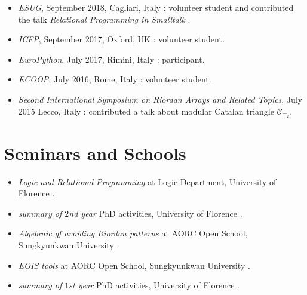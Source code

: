 \documentclass[a4paper]{tufte-handout}
\begin{document}
    \begin{itemize}
        \item \emph{ESUG}, September 2018, Cagliari, Italy : volunteer student and
        contributed the talk \textit{Relational Programming in Smalltalk} .
        \item \emph{ICFP}, September 2017, Oxford, UK : volunteer student.
        \item \emph{EuroPython}, July 2017, Rimini, Italy : participant.
        \item \emph{ECOOP}, July 2016, Rome, Italy : volunteer student.
        \item \emph{Second International Symposium on Riordan Arrays and Related Topics}, 
            July 2015 Lecco, Italy : contributed a talk about modular Catalan triangle $\mathcal{C}_{\equiv_{2}}$.
    \end{itemize}

    \section{Seminars and Schools}

    \begin{itemize}
        \item \textit{Logic and Relational Programming} at Logic Department, University of Florence .
        \item \textit{summary of $2$nd year} PhD activities, University of Florence .
        \item \textit{Algebraic gf avoiding Riordan patterns} at AORC Open School, Sungkyunkwan University .
        \item \textit{EOIS tools} at AORC Open School, Sungkyunkwan University .
        \item \textit{summary of $1$st year} PhD activities, University of Florence .
    \end{itemize}
\end{document}
